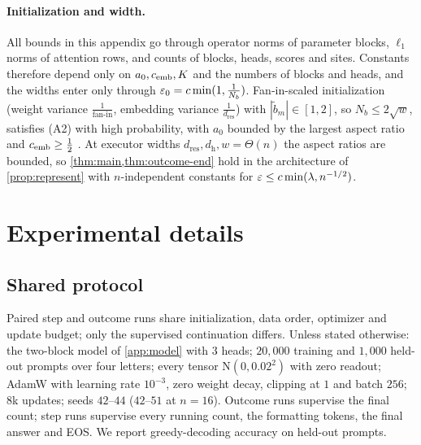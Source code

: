 \paragraph{Initialization and width.}
\label{rem:end-width}
All bounds in this appendix go through operator norms of parameter blocks, $\ell_1$ norms of attention rows, and counts of blocks,
heads, scores and sites. Constants therefore depend only on $a_0,c_{\mathrm{emb}},K$ and the numbers of blocks and heads, and the widths enter only
through $\varepsilon_0=c\min(1,\frac{1}{N_b})$. Fan-in-scaled initialization (weight variance $\frac{1}{\text{fan-in}}$, embedding variance $\frac{1}{d_{\mathrm{res}}}$) with
$|\tilde b_m|\in[1,2]$, so $N_b\le2\sqrt w$, satisfies (A2) with high probability, with $a_0$ bounded by the largest aspect ratio and $c_{\mathrm{emb}}\ge\frac{1}{2}$
\citep[Thms.~4.4.5, 4.6.1]{vershynin2018high}. At executor widths $d_{\mathrm{res}},d_{\mathrm h},w=\Theta(n)$ the aspect ratios are bounded, so
\cref{thm:main,thm:outcome-end} hold in the architecture of \cref{prop:represent} with $n$-independent constants for
$\varepsilon\le c\min(\lambda,n^{-1/2})$.






\section{Experimental details}
\label{app:experiments}
\label{app:experimental-details}

\subsection{Shared protocol}
\label{app:letter-protocol}
Paired step and outcome runs share initialization, data order, optimizer and update budget; only the supervised continuation
differs. Unless stated otherwise: the two-block model of \cref{app:model} with $3$ heads; $20{,}000$ training and $1{,}000$ held-out
prompts over four letters; every tensor $\mathrm N(0,0.02^2)$ with zero readout; AdamW with learning rate $10^{-3}$, zero weight decay,
clipping at $1$ and batch $256$; $8$k updates; seeds $42$--$44$ ($42$--$51$ at $n=16$). Outcome runs supervise the final count; step
runs supervise every running count, the formatting tokens, the final answer and EOS. We report greedy-decoding accuracy on held-out prompts.
\label{tab:protocol}

